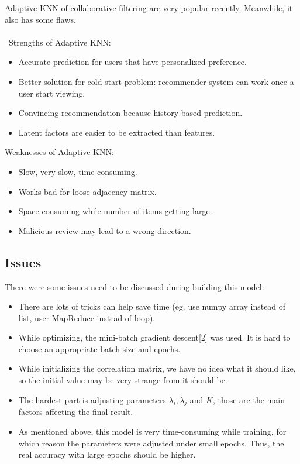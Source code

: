 \documentclass[paper=a4, fontsize=11pt, twocolumn]{scrartcl} %
\numberwithin{equation}{section} %
\numberwithin{figure}{section} %
\numberwithin{table}{section} %
\begin{document}
Adaptive KNN of collaborative filtering are very popular recently. Meanwhile, it also has some flaws.\\
\\\
Strengths of Adaptive KNN:
\begin{itemize}
	\item Accurate prediction for users that have personalized preference.
	\item Better solution for cold start problem: recommender system can work once a user start viewing. 
	\item Convincing recommendation because history-based prediction.
	\item Latent factors are easier to be extracted than features. 
\end{itemize}

Weaknesses of Adaptive KNN:
\begin{itemize}
	\item Slow, very slow, time-consuming.
	\item Works bad for loose adjacency matrix.
	\item Space consuming while number of items getting large.
	\item Malicious review may lead to a wrong direction. 
\end{itemize}


\subsection{Issues}

There were some issues need to be discussed during building this model:

\begin{itemize}
	\item There are lots of tricks can help save time (eg. use numpy array instead of list, user MapReduce instead of loop).
	\item While optimizing, the mini-batch gradient descent[2] was used. It is hard to choose an appropriate batch size and epochs.
	\item While initializing the correlation matrix, we have no idea what it should like, so the initial value may be very strange from it should be.  
	\item The hardest part is adjusting parameters $\lambda_i,\lambda_j$ and $K$, those are the main factors affecting the final result.
	\item As mentioned above, this model is very time-consuming while training, for which reason the parameters were adjusted under small epochs. Thus, the real accuracy with large epochs should be higher.
\end{itemize}
\end{document}
